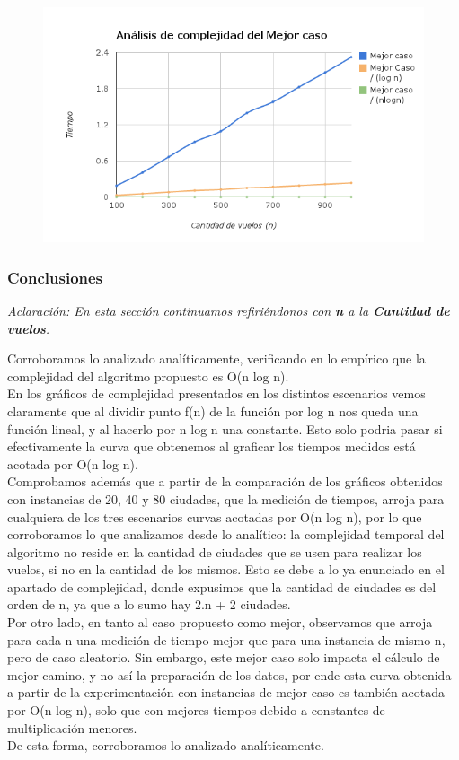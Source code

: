 \documentclass[10pt,a4paper]{article}
\begin{document}
\newpage
	\begin{figure}[h]
		\begin{center}
		   \includegraphics[scale=0.75]{graficos/complejidad_mejorCaso.png}
		\end{center}
	\end{figure}


\subsubsection{Conclusiones}
\textit{Aclaración: En esta sección continuamos refiriéndonos con \textbf{n} a la \textbf{Cantidad de vuelos}.}

\noindent Corroboramos lo analizado analíticamente, verificando en lo empírico que la complejidad del algoritmo propuesto es O(n log n).\\
\noindent En los gráficos de complejidad presentados en los distintos escenarios vemos claramente que al dividir punto f(n) de la función por log n nos queda una función lineal, y al hacerlo por n log n una constante. Esto solo podria pasar si efectivamente la curva que obtenemos al graficar los tiempos medidos está acotada por O(n log n).\\
\noindent Comprobamos además que a partir de la comparación de los gráficos obtenidos con instancias de 20, 40 y 80 ciudades, que la medición de tiempos, arroja para cualquiera de los tres escenarios curvas acotadas por O(n log n), por lo que corroboramos lo que analizamos desde lo analítico: la complejidad temporal del algoritmo no reside en la cantidad de ciudades que se usen para realizar los vuelos, si no en la cantidad de los mismos. Esto se debe a lo ya enunciado en el apartado de complejidad, donde expusimos que la cantidad de ciudades es del orden de n, ya que a lo sumo hay 2.n + 2 ciudades.\\
\noindent Por otro lado, en tanto al caso propuesto como mejor, observamos que arroja para cada n una medición de tiempo mejor que para una instancia de mismo n, pero de caso aleatorio. Sin embargo, este mejor caso solo impacta el cálculo de mejor camino, y no así la preparación de los datos, por ende esta curva obtenida a partir de la experimentación con instancias de mejor caso es también acotada por O(n log n), solo que con mejores tiempos debido a constantes de multiplicación menores.\\
\noindent De esta forma, corroboramos lo analizado analíticamente.\\
\end{document}
